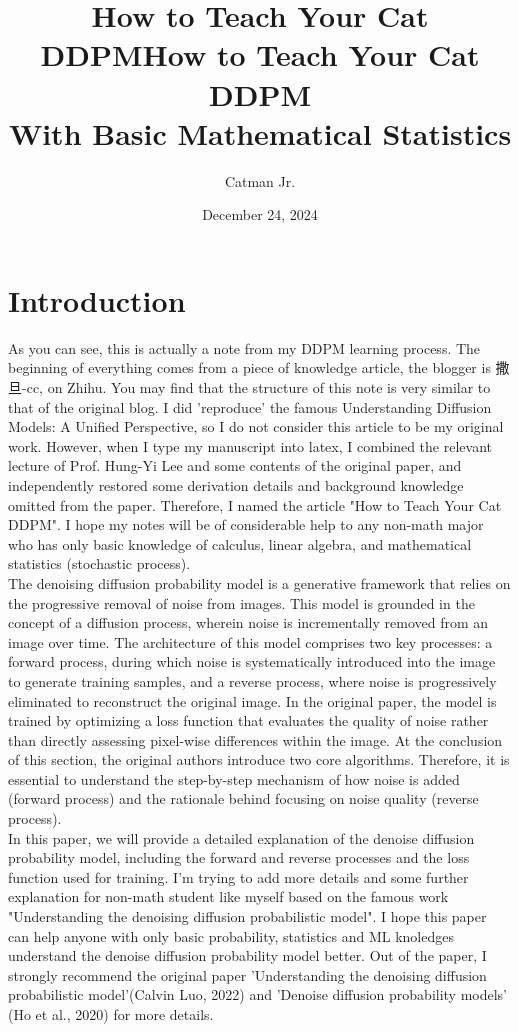 \documentclass{article}
\title{How to Teach Your Cat DDPM}
\title{How to Teach Your Cat DDPM\\\large With Basic Mathematical Statistics}
\author{Catman Jr.}
\date{December 24, 2024}
\begin{document}
\maketitle
\section*{Introduction}
    \qquad As you can see, this is actually a note from my DDPM learning process. The beginning of everything comes from a piece of knowledge article, 
    the blogger is 撒旦-cc, on Zhihu. You may find that the structure of this note is very similar to that of the original blog. I did 'reproduce' the famous Understanding Diffusion Models: A Unified Perspective, 
    so I do not consider this article to be my original work. However, when I type my manuscript into latex, I combined the relevant lecture of Prof. Hung-Yi Lee and some contents of the original paper, 
    and independently restored some derivation details and background knowledge omitted from the paper. Therefore, I named the article "How to Teach Your Cat DDPM". 
    I hope my notes will be of considerable help to any non-math major who has only basic knowledge of calculus, linear algebra, and mathematical statistics (stochastic process).\\

    \qquad The denoising diffusion probability model is a generative framework that relies on the progressive removal of noise from images. 
    This model is grounded in the concept of a diffusion process, wherein noise is incrementally removed from an image over time. The architecture of this model comprises two key processes: 
    a forward process, during which noise is systematically introduced into the image to generate training samples, and a reverse process, where noise is progressively eliminated to reconstruct the original image.
    In the original paper, the model is trained by optimizing a loss function that evaluates the quality of noise rather than directly assessing pixel-wise differences within the image. 
    At the conclusion of this section, the original authors introduce two core algorithms. 
    Therefore, it is essential to understand the step-by-step mechanism of how noise is added (forward process) and the rationale behind focusing on noise quality (reverse process). \\

    \qquad In this paper, we will provide a detailed explanation of the denoise diffusion probability model, including the forward and reverse processes and the loss function used for training.
    I'm trying to add more details and some further explanation for non-math student like myself based on the famous work "Understanding the denoising diffusion probabilistic model".
    I hope this paper can help anyone with only basic probability, statistics and ML knoledges understand the denoise diffusion probability model better.
    Out of the paper, I strongly recommend the original paper 'Understanding the denoising diffusion probabilistic model'(Calvin Luo, 2022) and 'Denoise diffusion probability models' (Ho et al., 2020) for more details.
\end{document}
